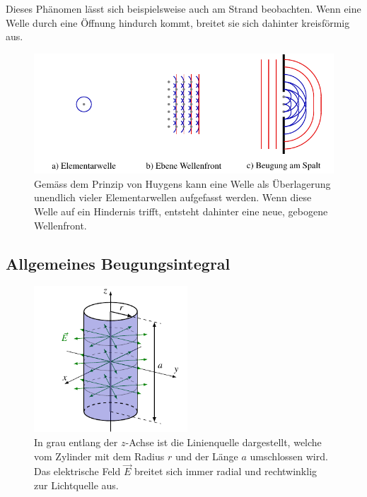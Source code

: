 Dieses Phänomen lässt sich beispielsweise auch am Strand beobachten. 
Wenn eine Welle durch eine Öffnung hindurch kommt, breitet sie sich dahinter kreisförmig aus.

\begin{figure}
    \centering
    \includegraphics[width=120mm]{papers/opt/images/huygens.pdf}
    \caption{Gemäss dem Prinzip von Huygens kann eine Welle als Überlagerung unendlich vieler Elementarwellen aufgefasst werden.
    Wenn diese Welle auf ein Hindernis trifft, entsteht dahinter eine neue, gebogene Wellenfront.}
    \label{opt:fig:huygens}
\end{figure}


\subsection{Allgemeines Beugungsintegral}

\begin{figure}
    \centering
    \includegraphics[width=57.34mm]{papers/opt/images/maxwell.pdf}
    \caption{In grau entlang der $z$-Achse ist die Linienquelle dargestellt, welche vom Zylinder mit dem Radius $r$ und der Länge $a$ umschlossen wird.
    Das elektrische Feld $\vec{E}$ breitet sich immer radial und rechtwinklig zur Lichtquelle aus.}
    \label{opt:fig:maxwell}
\end{figure}


